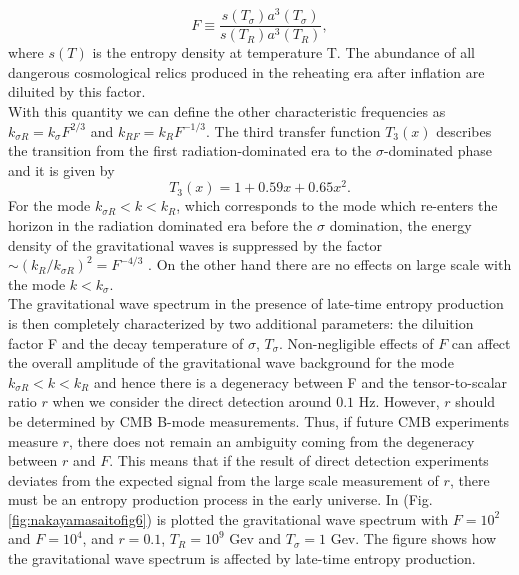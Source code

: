 \documentclass[11pt,a4paper,twoside]{book}
\begin{document}
\begin{equation}
	\label{Chap3:DiluitionFactor}
	F \equiv \frac{s(T_{\sigma})a^{3}(T_{\sigma})}{s(T_{R})a^{3}(T_{R})},
\end{equation}
where $ s(T) $ is the entropy density at temperature T. The abundance of all dangerous cosmological relics produced in the reheating era after inflation are diluited by this factor.\\
With this quantity  we can define the other characteristic frequencies as $ k_{\sigma R}=k_{\sigma}F^{2/3} $ and $ k_{RF}=k_{R}F^{-1/3} $. The third transfer function $ T_{3}(x) $ describes the transition from the first radiation-dominated era to the $\sigma$-dominated phase and it is given by \cite{Chap3:ProibingReheatingTemperature2008}
\begin{equation}
	\label{Chap3:ThirdTransferFunction}
	T_{3}(x) = 1 + 0.59x + 0.65x^{2}.
\end{equation}
For the mode $ k_{\sigma R} < k < k_{R}$, which corresponds to the mode which re-enters the horizon in the radiation dominated era before the $\sigma$ domination, the energy density of the gravitational waves is suppressed by the factor $\sim (k_{R}/k_{\sigma R})^{2} = F^{-4/3}$ \cite{Chap3:Seto_Yokohama}. On the other hand there are no effects on large scale with the mode $ k < k_{\sigma} $.\\
The gravitational wave spectrum in the presence of late-time entropy production is then completely characterized by two additional parameters: the diluition factor F and the decay temperature of $\sigma$, $ T_{\sigma} $. Non-negligible effects of $ F $ can affect the overall amplitude of the gravitational wave background for the mode $ k_{\sigma R} < k < k_{R} $ and hence there is a degeneracy between F and the tensor-to-scalar ratio $ r $ when we consider the direct detection around $ 0.1 $ Hz. However, $ r $ should be determined by CMB B-mode measurements. Thus, if future CMB experiments measure $ r $, there does not remain an ambiguity coming from the degeneracy between $ r $ and $ F $. This means that if the result of direct detection experiments deviates from the expected signal from the large scale measurement of $ r $, there must be an entropy production process in the early universe. In (Fig. \ref{fig:nakayamasaitofig6}) is plotted the gravitational wave spectrum with $ F=10^{2} $ and $ F=10^{4} $, and $ r=0.1 $, $ T_{R}=10^{9} $  Gev and $ T_{\sigma} = 1 $ Gev. The figure shows how the gravitational wave spectrum is affected by late-time entropy production.\\
\end{document}
